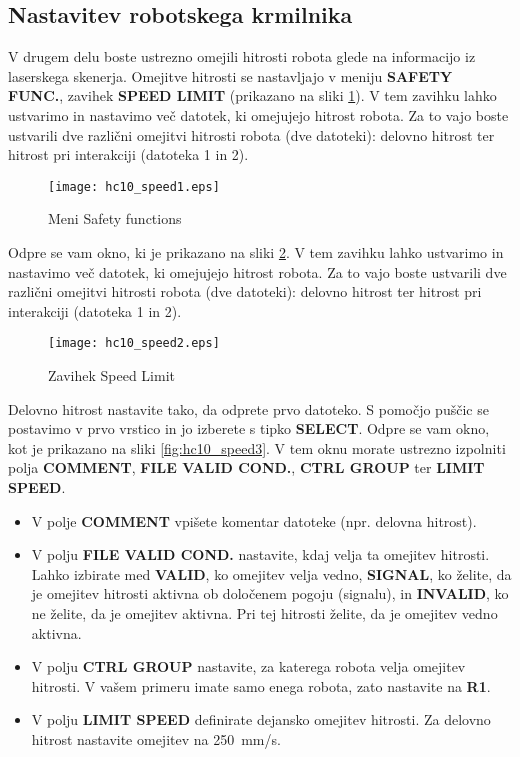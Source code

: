 \subsection{Nastavitev robotskega krmilnika} \label{realni3}

V drugem delu boste ustrezno omejili hitrosti robota glede na informacijo iz laserskega skenerja. Omejitve hitrosti se nastavljajo v meniju \textbf{SAFETY FUNC.}, zavihek \textbf{SPEED LIMIT} (prikazano na sliki \ref{fig:hc10_speed1}). V tem zavihku lahko ustvarimo in nastavimo več datotek, ki omejujejo hitrost robota. Za to vajo boste ustvarili dve različni omejitvi hitrosti robota (dve datoteki): delovno hitrost ter hitrost pri interakciji (datoteka 1 in 2).

\begin{figure}[!hbt]
	\centering
	\texttt{[image: hc10\_speed1.eps]}
	\caption{Meni Safety functions}
	\label{fig:hc10_speed1}
\end{figure}

Odpre se vam okno, ki je prikazano na sliki \ref{fig:hc10_speed2}. V tem zavihku lahko ustvarimo in nastavimo več datotek, ki omejujejo hitrost robota. Za to vajo boste ustvarili dve različni omejitvi hitrosti robota (dve datoteki): delovno hitrost ter hitrost pri interakciji (datoteka 1 in 2).

\begin{figure}[!hbt]
	\centering
	\texttt{[image: hc10\_speed2.eps]}
	\caption{Zavihek Speed Limit}
	\label{fig:hc10_speed2}
\end{figure}

Delovno hitrost nastavite tako, da odprete prvo datoteko. S pomočjo puščic se postavimo v prvo vrstico in jo izberete s tipko \textbf{SELECT}. Odpre se vam okno, kot je prikazano na sliki \ref{fig:hc10_speed3}. V tem oknu morate ustrezno izpolniti polja \textbf{COMMENT}, \textbf{FILE VALID COND.}, \textbf{CTRL GROUP} ter \textbf{LIMIT SPEED}.

\begin{itemize}
	\item V polje \textbf{COMMENT} vpišete komentar datoteke (npr. delovna hitrost).
	\item V polju \textbf{FILE VALID COND.} nastavite, kdaj velja ta omejitev hitrosti. Lahko izbirate med \textbf{VALID}, ko omejitev velja vedno, \textbf{SIGNAL}, ko želite, da je omejitev hitrosti aktivna ob določenem pogoju (signalu), in {\textbf{INVALID}}, ko ne želite, da je omejitev aktivna. Pri tej hitrosti želite, da je omejitev vedno aktivna.
	\item V polju \textbf{CTRL GROUP} nastavite, za katerega robota velja omejitev hitrosti. V vašem primeru imate samo enega robota, zato nastavite na \textbf{R1}.
	\item V polju \textbf{LIMIT SPEED} definirate dejansko omejitev hitrosti. Za delovno hitrost nastavite omejitev na 250~mm/s.
\end{itemize}

